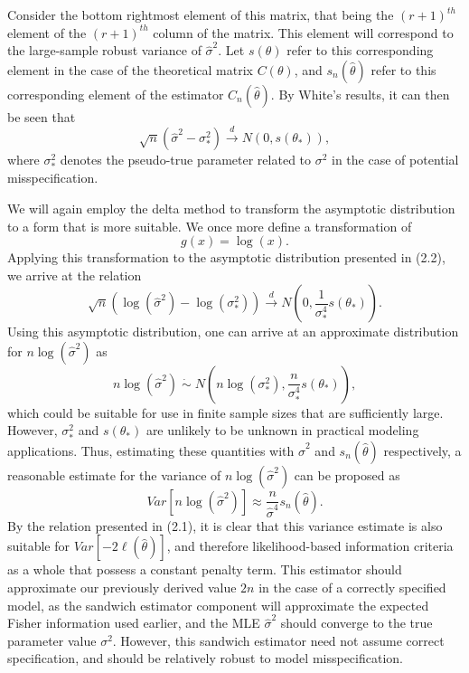 \documentclass[12pt]{article} %
\theoremstyle{definition}
\begin{document}
		Consider the bottom rightmost element of this matrix, that being the $(r+1)^{th}$ element of the $(r+1)^{th}$ column of the matrix. This element will correspond to the large-sample
		robust variance of $\hat{\sigma}^2$. Let $s(\theta)$ refer to this corresponding element in the case of the theoretical matrix $C(\theta)$, and $s_n(\hat{\theta})$ refer to this
		corresponding element of the estimator $C_n(\hat{\theta})$. By White's results, it can then be seen that
		\begin{equation}
			\sqrt{n} (\hat{\sigma}^2 - \sigma_*^2) \xrightarrow[]{d} N(0, s(\theta_*)) ,
		\end{equation}
		where $\sigma_*^2$ denotes the pseudo-true parameter related to $\sigma^2$ in the case of potential misspecification.

		We will again employ the delta method to transform the asymptotic distribution to a form that is more suitable. We once more define a transformation of
		\begin{equation*}
			g(x) = \log(x) .
		\end{equation*}
		Applying this transformation to the asymptotic distribution presented in (2.2), we arrive at the relation
		\begin{equation*}
			\sqrt{n} ( \log (\hat{\sigma}^2) - \log(\sigma_*^2)) \xrightarrow[]{d} N \left( 0, \frac{1}{\sigma_*^4} s(\theta_*) \right) .
		\end{equation*}
		Using this asymptotic distribution, one can arrive at an approximate distribution for $n\log(\hat{\sigma}^2)$ as
		\begin{equation*}
			n\log(\hat{\sigma}^2) \; \dot\sim \; N \left( n\log(\sigma_* ^2), \frac{n}{\sigma_*^4} s(\theta_*) \right) ,
		\end{equation*}
		which could be suitable for use in finite sample sizes that are sufficiently large. However, $\sigma_*^2$ and $s(\theta_*)$ are unlikely to be unknown in practical modeling
		applications. Thus, estimating these quantities with $\hat{\sigma}^2$ and $s_n(\hat{\theta})$ respectively, a reasonable estimate for the variance of $n\log(\hat{\sigma}^2)$ can
		be proposed as
		\begin{equation*}
			Var \left[ n\log(\hat{\sigma}^2) \right] \approx \frac{n}{\hat{\sigma}^4} s_n(\hat{\theta}) .
		\end{equation*}
		By the relation presented in (2.1), it is clear that this variance estimate is also suitable for $Var \left[ -2 \ell (\hat{\theta}  ) \right]$, and therefore
		likelihood-based information criteria as a whole that possess a constant penalty term. This estimator should approximate our previously derived value $2n$ in the case of a correctly
		specified model, as the sandwich estimator component will approximate the expected Fisher information used earlier, and the MLE $\hat{\sigma}^2$ should converge to the true
		parameter value $\sigma^2$. However, this sandwich estimator need not assume correct specification, and should be relatively robust to model misspecification.
		
\end{document}
